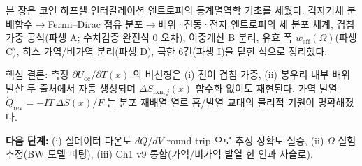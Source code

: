 \documentclass[11pt,a4paper]{article}
\newcommand{\rxn}{\mathrm{rxn}}
\newcommand{\rev}{\mathrm{rev}}
\newcommand{\oc}{\mathrm{oc}}
\newcommand{\eff}{\mathrm{eff}}
\begin{document}
본 장은 코인 하프셀 인터칼레이션 엔트로피의 통계열역학 기초를 세웠다.
격자기체 분배함수$\to$Fermi--Dirac 점유 분포$\to$배위·진동·전자 엔트로피의 세 분포 체계,
겹침 가중 공식(파생 A; 수치검증 완전식 0 오차), 이중계산 B 분리,
유효 폭 $w_\eff(\Omega)$(파생 C), 히스 가역/비가역 분리(파생 D), 극한 6건(파생 I)을
닫힌 식으로 정리했다.

핵심 결론: 측정 $\partial U_\oc/\partial T(x)$ 의 비선형은 (i) 전이 겹침 가중, (ii) 봉우리 내부
배위 발산 두 출처에서 자동 생성되며 $\Delta S_{\rxn,j}(x)$ 함수화 없이도 재현된다.
가역 발열 $\dot Q_\rev = -IT\,\Delta S(x)/F$ 는 분포 재배열 열로 흡/발열 교대의 물리적 기원이 명확해졌다.

\textbf{다음 단계:} (i) 실데이터 다온도 $dQ/dV$ round-trip 으로 추정 정확도 실증,
(ii) $\Omega$ 실험 추정(BW 모델 피팅), (iii) Ch1 v9 통합(가역/비가역 발열 한 인과 사슬로).
\end{document}
